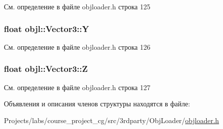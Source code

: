 См. определение в файле objloader.\+h строка 125

\subsubsection[{\texorpdfstring{Y}{Y}}]{\setlength{\rightskip}{0pt plus 5cm}float objl\+::\+Vector3\+::Y}\hypertarget{structobjl_1_1_vector3_a2d214055c5afbf6a5fc12d983a10e1e3}{}\label{structobjl_1_1_vector3_a2d214055c5afbf6a5fc12d983a10e1e3}


См. определение в файле objloader.\+h строка 126

\subsubsection[{\texorpdfstring{Z}{Z}}]{\setlength{\rightskip}{0pt plus 5cm}float objl\+::\+Vector3\+::Z}\hypertarget{structobjl_1_1_vector3_a88dcef85136079e5483e532691e9853c}{}\label{structobjl_1_1_vector3_a88dcef85136079e5483e532691e9853c}


См. определение в файле objloader.\+h строка 127



Объявления и описания членов структуры находятся в файле\+:\begin{DoxyCompactItemize}
\item 
Projects/labs/course\+\_\+project\+\_\+cg/src/3rdparty/\+Obj\+Loader/\hyperlink{3rdparty_2_obj_loader_2objloader_8h}{objloader.\+h}\end{DoxyCompactItemize}
